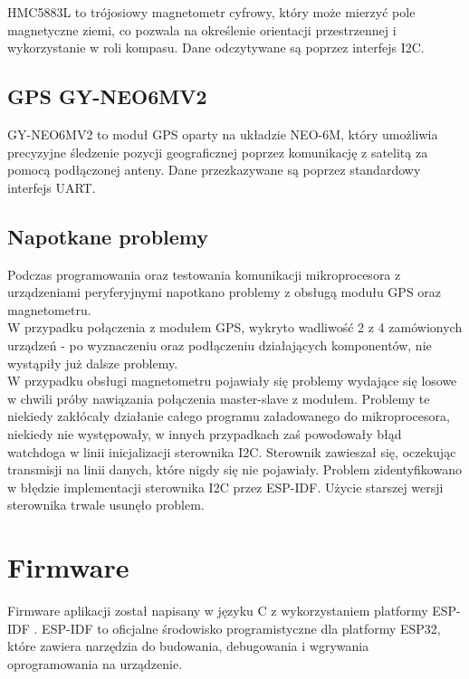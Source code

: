 HMC5883L to trójosiowy magnetometr cyfrowy, który może mierzyć pole magnetyczne ziemi, co pozwala na określenie orientacji przestrzennej i wykorzystanie w roli kompasu. Dane odczytywane są poprzez interfejs I2C.

\subsection{GPS GY-NEO6MV2}

GY-NEO6MV2 to moduł GPS oparty na układzie NEO-6M, który umożliwia precyzyjne śledzenie pozycji geograficznej poprzez komunikację z satelitą za pomocą podłączonej anteny. Dane przezkazywane są poprzez standardowy interfejs UART.

\subsection{Napotkane problemy}

Podczas programowania oraz testowania komunikacji mikroprocesora z urządzeniami peryferyjnymi napotkano problemy z obsługą modułu GPS oraz magnetometru. \\

W przypadku połączenia z modułem GPS, wykryto wadliwość 2 z 4 zamówionych urządzeń - po wyznaczeniu oraz podłączeniu działających komponentów, nie wystąpiły już dalsze problemy. \\

W przypadku obsługi magnetometru pojawiały się problemy wydające się losowe w chwili próby nawiązania połączenia master-slave z modułem. Problemy te niekiedy zakłócały działanie całego programu załadowanego do mikroprocesora, niekiedy nie występowały, w innych przypadkach zaś powodowały błąd watchdoga w linii inicjalizacji sterownika I2C. Sterownik zawieszał się, oczekując transmisji na linii danych, które nigdy się nie pojawiały. Problem zidentyfikowano w błędzie implementacji sterownika I2C przez ESP-IDF. Użycie starszej wersji sterownika trwale usunęło problem. 

\section{Firmware}
Firmware aplikacji został napisany w języku C z wykorzystaniem platformy ESP-IDF \cite{esp-idf}.
ESP-IDF to oficjalne środowisko programistyczne dla platformy ESP32, które zawiera narzędzia do budowania, debugowania i wgrywania oprogramowania na urządzenie.

